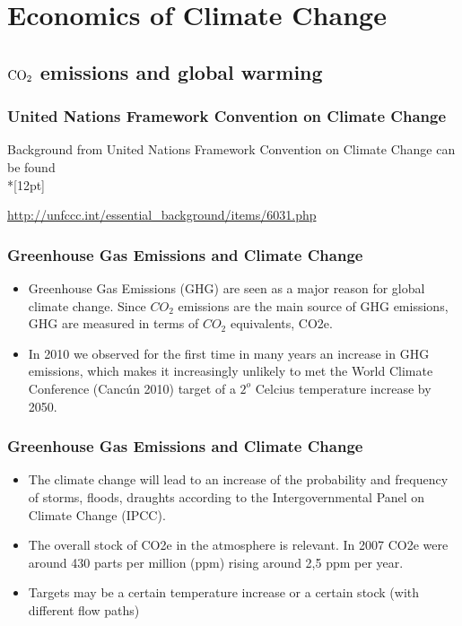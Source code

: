 \section{Economics of Climate Change}
\subsection[Emissions]{$\textnormal{CO}_2$ emissions and global warming}
\begin{frame}\frametitle{United Nations Framework Convention on Climate Change}

Background from United Nations Framework Convention on Climate Change can be found\\*[12pt]

\url{http://unfccc.int/essential_background/items/6031.php}

\end{frame}

\begin{frame} \frametitle{Greenhouse Gas Emissions and Climate Change}
\begin{itemize}
\item<1-> Greenhouse Gas Emissions (GHG) are seen as a major reason for global climate change. Since ${CO}_2$ emissions are the main source of GHG emissions, GHG are measured in terms of ${CO}_2$ equivalents, CO2e.
\item<2-> In 2010 we observed for the first time in many years an increase in GHG emissions, which makes it increasingly unlikely to met the World Climate Conference (Canc{\'u}n 2010) target of a $2^o$ Celcius temperature increase by 2050.
\end{itemize}
\end{frame}

\begin{frame} \frametitle{Greenhouse Gas Emissions and Climate Change}
\begin{itemize}
\item<1-> The climate change will lead to an increase of the probability and frequency of storms, floods, draughts according to the Intergovernmental Panel on Climate Change (IPCC).
\item<2-> The overall stock of CO2e in the atmosphere is relevant. In 2007 CO2e were around 430 parts per million (ppm) rising around 2,5 ppm per year.
\item<3-> Targets may be a certain temperature increase or a certain stock (with different flow paths)
\end{itemize}
\end{frame}


